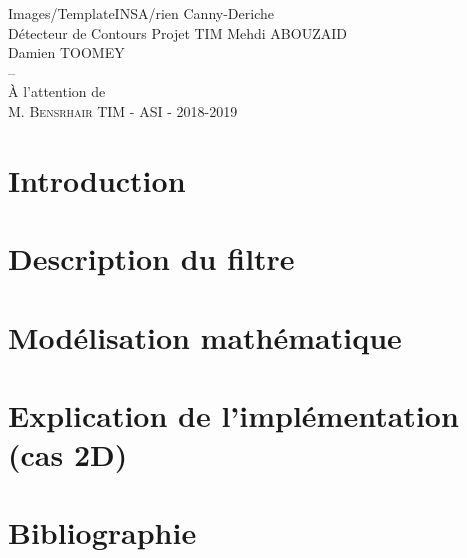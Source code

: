 \documentclass[12pt,a4paper]{article}
\begin{document}
\PageDeGarde
{Images/TemplateINSA/rien} %
{Canny-Deriche\\ Détecteur de Contours} %
{Projet TIM} %
{Mehdi \textsc{ABOUZAID}\\
 Damien \textsc{TOOMEY}\\
 --\\
 À l'attention de \\ M. \textsc{Bensrhair}} %
{TIM - ASI - 2018-2019} %


\newpage
\tableofcontents

\newpage
\section{Introduction}


\newpage
\section{Description du filtre}


\newpage
\section{Modélisation mathématique}


\newpage
\section{Explication de l'implémentation (cas 2D)}


\newpage
\section{Bibliographie}

\end{document}
